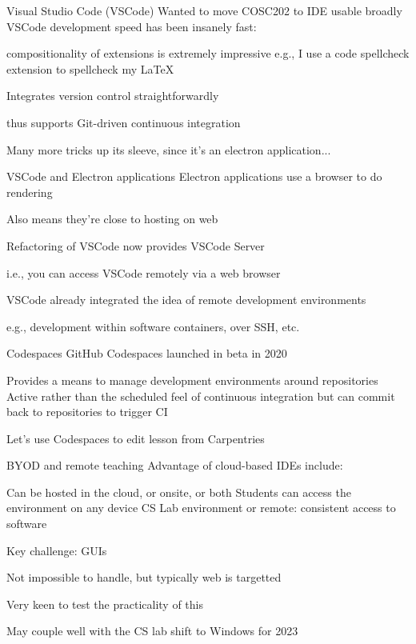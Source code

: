 \documentclass[aspectratio=169,t]{beamer}
\begin{document}
\begin{dframe}{Visual Studio Code (VSCode)}
  \1 Wanted to move COSC202 to IDE usable broadly
  \1 VSCode development speed has been insanely fast:
  
  \2 compositionality of extensions is extremely impressive
  \2 e.g., I use a code spellcheck extension to spellcheck my \LaTeX{}

  \1 Integrates version control straightforwardly
  
  \2 thus supports Git-driven continuous integration
  
  \1 Many more tricks up its sleeve, since it's an electron application...
\end{dframe}

\begin{dframe}{VSCode and Electron applications}
  \1 Electron applications use a browser to do rendering
  
  \2 Also means they're close to hosting on web

  \bigskip

  \1 Refactoring of VSCode now provides VSCode Server
  
  \2 i.e., you can access VSCode remotely via a web browser
  
  \bigskip

  \1 VSCode already integrated the idea of remote development environments

  \2 e.g., development within software containers, over SSH, etc.
\end{dframe}

\begin{dframe}{Codespaces}
  \1 GitHub Codespaces launched in beta in 2020 %

  \2 Provides a means to manage development environments around repositories
  \2 Active rather than the scheduled feel of continuous integration
  \2 but can commit back to repositories to trigger CI

  \bigskip

  \1 Let's use Codespaces to edit lesson from Carpentries
\end{dframe}

\begin{dframe}{BYOD and remote teaching}
  \1 Advantage of cloud-based IDEs include:
  
  \2 Can be hosted in the cloud, or onsite, or both
  \2 Students can access the environment on any device
  \2 CS Lab environment or remote: consistent access to software

  \1 Key challenge: GUIs
  
  \2 Not impossible to handle, but typically web is targetted

  \1 Very keen to test the practicality of this
  
  \2 May couple well with the CS lab shift to Windows for 2023
\end{dframe}
\end{document}
